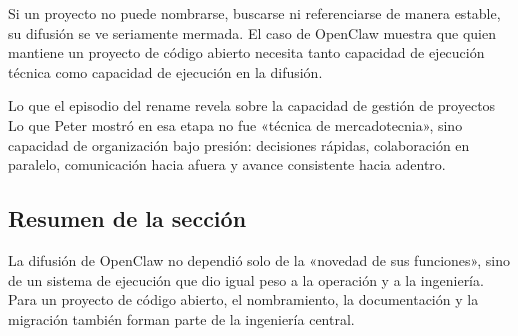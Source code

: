 Si un proyecto no puede nombrarse, buscarse ni referenciarse de manera estable, su difusión se ve seriamente mermada. El caso de OpenClaw muestra que quien mantiene un proyecto de código abierto necesita tanto capacidad de ejecución técnica como capacidad de ejecución en la difusión.

\begin{importantbox}{Lo que el episodio del rename revela sobre la capacidad de gestión de proyectos}
Lo que Peter mostró en esa etapa no fue «técnica de mercadotecnia», sino capacidad de organización bajo presión: decisiones rápidas, colaboración en paralelo, comunicación hacia afuera y avance consistente hacia adentro.
\end{importantbox}

\subsection{Resumen de la sección}
La difusión de OpenClaw no dependió solo de la «novedad de sus funciones», sino de un sistema de ejecución que dio igual peso a la operación y a la ingeniería. Para un proyecto de código abierto, el nombramiento, la documentación y la migración también forman parte de la ingeniería central.
